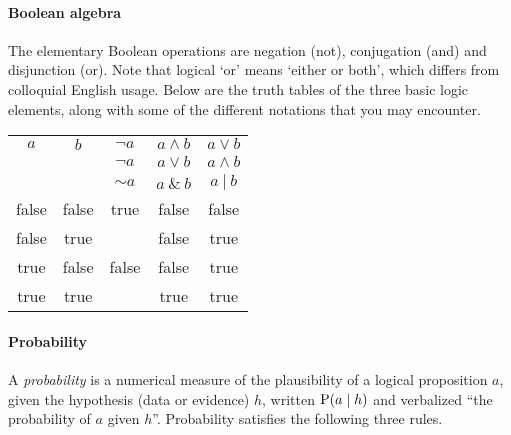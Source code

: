 \documentclass[Lectures.tex]{subfiles}
\begin{document}
\paragraph{Boolean algebra}
The elementary Boolean operations are negation (not), conjugation (and) and disjunction (or). Note that logical `or' means `either or both', which differs from colloquial English usage. Below are the truth tables of the three basic logic elements, along with some of the different notations that you may encounter.


\begin{center}
\begin{tabular}{cc|ccc}
$a$ & $b$ & $\lnot a$ & $ a \land b$ &$a \lor b $\\
& & $\neg a$ & $ a \vee b$ &$a \wedge b $\\
& & $\sim a$ & $ a~\&~b$ & $a~\vert~b$  \\
\hline
false & false & true & false & false \\
false & true &  & false & true \\
true & false &  false &  false & true \\
true & true &  & true  & true
\end{tabular}
\end{center}




\paragraph{Probability}
A {\sl probability}  is a numerical measure of the plausibility of a logical proposition $a$, given the hypothesis (data or evidence) $h$, written $\operatorname{P}(a\mathrel{\vert} h)$ and verbalized  ``the probability of $a$ given $h$''. Probability satisfies the following three rules.
\end{document}
